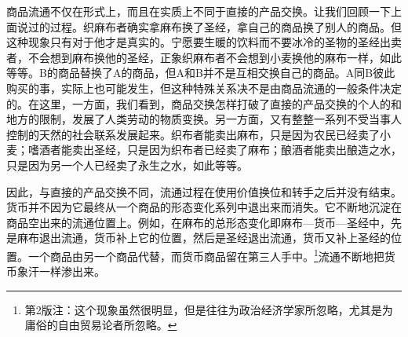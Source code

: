 \documentclass{ctexbook}
\begin{document}
        商品流通不仅在形式上，而且在实质上不同于直接的产品交换。让我们回顾一下上面说过的过程。织麻布者确实拿麻布换了圣经，拿自己的商品换了别人的商品。但这种现象只有对于他才是真实的。宁愿要生暖的饮料而不要冰冷的圣物的圣经出卖者，不会想到麻布换他的圣经，正象织麻布者不会想到小麦换他的麻布一样，如此等等。B的商品替换了A的商品，但A和B并不是互相交换自己的商品。A同B彼此购买的事，实际上也可能发生，但这种特殊关系决不是由商品流通的一般条件决定的。在这里，一方面，我们看到，商品交换怎样打破了直接的产品交换的个人的和地方的限制，发展了人类劳动的物质变换。另一方面，又有整整一系列不受当事人控制的天然的社会联系发展起来。织布者能卖出麻布，只是因为农民已经卖了小麦；嗜酒者能卖出圣经，只是因为织布者已经卖了麻布；酿酒者能卖出酿造之水，只是因为另一个人已经卖了永生之水，如此等等。
        
        因此，与直接的产品交换不同，流通过程在使用价值换位和转手之后并没有结束。货币并不因为它最终从一个商品的形态变化系列中退出来而消失。它不断地沉淀在商品空出来的流通位置上。例如，在麻布的总形态变化即麻布—货币—圣经中，先是麻布退出流通，货币补上它的位置，然后是圣经退出流通，货币又补上圣经的位置。一个商品由另一个商品代替，而货币商品留在第三人手中。\footnote{第2版注：这个现象虽然很明显，但是往往为政治经济学家所忽略，尤其是为庸俗的自由贸易论者所忽略。}流通不断地把货币象汗一样渗出来。
        
\end{document}
